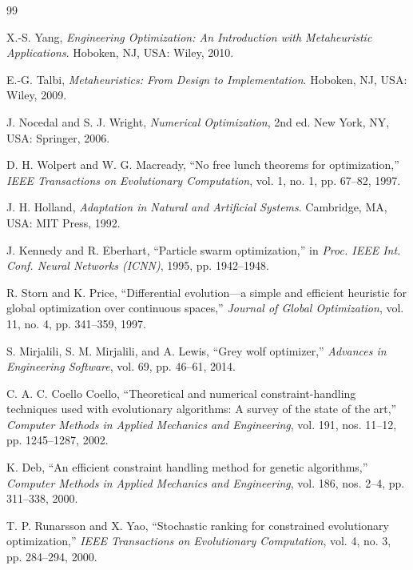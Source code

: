 \documentclass[a4paper,fleqn]{cas-sc}
\begin{document}
\begin{thebibliography}{99}

X.-S. Yang, \emph{Engineering Optimization: An Introduction with Metaheuristic Applications}. Hoboken, NJ, USA: Wiley, 2010.

E.-G. Talbi, \emph{Metaheuristics: From Design to Implementation}. Hoboken, NJ, USA: Wiley, 2009.

J. Nocedal and S. J. Wright, \emph{Numerical Optimization}, 2nd ed. New York, NY, USA: Springer, 2006.

D. H. Wolpert and W. G. Macready, ``No free lunch theorems for optimization,'' \emph{IEEE Transactions on Evolutionary Computation}, vol. 1, no. 1, pp. 67--82, 1997.

J. H. Holland, \emph{Adaptation in Natural and Artificial Systems}. Cambridge, MA, USA: MIT Press, 1992.

J. Kennedy and R. Eberhart, ``Particle swarm optimization,'' in \emph{Proc. IEEE Int. Conf. Neural Networks (ICNN)}, 1995, pp. 1942--1948.

R. Storn and K. Price, ``Differential evolution---a simple and efficient heuristic for global optimization over continuous spaces,'' \emph{Journal of Global Optimization}, vol. 11, no. 4, pp. 341--359, 1997.

S. Mirjalili, S. M. Mirjalili, and A. Lewis, ``Grey wolf optimizer,'' \emph{Advances in Engineering Software}, vol. 69, pp. 46--61, 2014.

C. A. C. Coello Coello, ``Theoretical and numerical constraint-handling techniques used with evolutionary algorithms: A survey of the state of the art,'' \emph{Computer Methods in Applied Mechanics and Engineering}, vol. 191, nos. 11--12, pp. 1245--1287, 2002.

K. Deb, ``An efficient constraint handling method for genetic algorithms,'' \emph{Computer Methods in Applied Mechanics and Engineering}, vol. 186, nos. 2--4, pp. 311--338, 2000.

T. P. Runarsson and X. Yao, ``Stochastic ranking for constrained evolutionary optimization,'' \emph{IEEE Transactions on Evolutionary Computation}, vol. 4, no. 3, pp. 284--294, 2000.


\end{thebibliography}
\end{document}
